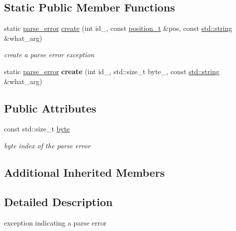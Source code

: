 \subsection*{Static Public Member Functions}
\begin{DoxyCompactItemize}
\item 
static \hyperlink{classnlohmann_1_1detail_1_1parse__error}{parse\+\_\+error} \hyperlink{classnlohmann_1_1detail_1_1parse__error_a137ea4d27de45d8a844fd13451d40f3d}{create} (int id\+\_\+, const \hyperlink{structnlohmann_1_1detail_1_1position__t}{position\+\_\+t} \&pos, const \hyperlink{namespacenlohmann_1_1detail_a1ed8fc6239da25abcaf681d30ace4985ab45cffe084dd3d20d928bee85e7b0f21}{std\+::string} \&what\+\_\+arg)
\begin{DoxyCompactList}\small\item\em create a parse error exception \end{DoxyCompactList}\item 
\mbox{\label{classnlohmann_1_1detail_1_1parse__error_a9fd60ad6bce80fd99686ad332faefd37}} 
static \hyperlink{classnlohmann_1_1detail_1_1parse__error}{parse\+\_\+error} {\bfseries create} (int id\+\_\+, std\+::size\+\_\+t byte\+\_\+, const \hyperlink{namespacenlohmann_1_1detail_a1ed8fc6239da25abcaf681d30ace4985ab45cffe084dd3d20d928bee85e7b0f21}{std\+::string} \&what\+\_\+arg)
\end{DoxyCompactItemize}
\subsection*{Public Attributes}
\begin{DoxyCompactItemize}
\item 
const std\+::size\+\_\+t \hyperlink{classnlohmann_1_1detail_1_1parse__error_a9505aaa1ca943be927eec7cc579592ff}{byte}
\begin{DoxyCompactList}\small\item\em byte index of the parse error \end{DoxyCompactList}\end{DoxyCompactItemize}
\subsection*{Additional Inherited Members}


\subsection{Detailed Description}
exception indicating a parse error 

